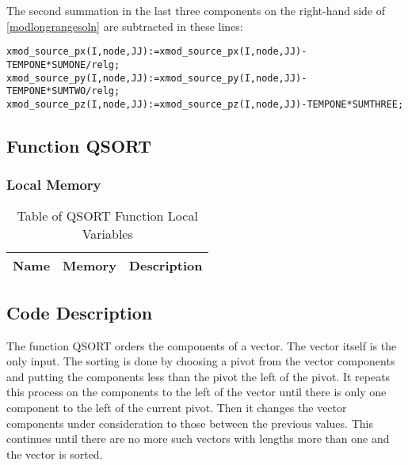 \documentclass[oneside,12pt]{book}
\begin{document}
The second summation in the last three components on the right-hand side of \eqref{modlongrangesoln} are subtracted in these lines:
\begin{small}
\begin{lstlisting}
xmod_source_px(I,node,JJ):=xmod_source_px(I,node,JJ)-TEMPONE*SUMONE/relg;
xmod_source_py(I,node,JJ):=xmod_source_py(I,node,JJ)-TEMPONE*SUMTWO/relg;
xmod_source_pz(I,node,JJ):=xmod_source_pz(I,node,JJ)-TEMPONE*SUMTHREE;
\end{lstlisting} 
\end{small}


\subsection{Function QSORT}
\subsubsection*{Local Memory}
\begin{center}
\begin{table}[ht]
\begin{tabular}{|c|c|p{5in}|}
\hline
\textbf{Name} & \textbf{Memory} & \textbf{Description}\\
\hline
\end{tabular}
\caption{Table of QSORT Function Local Variables}
\end{table}
\end{center}
\subsection{Code Description}
The function QSORT orders the components of a vector.  The vector itself is the only input.  The sorting is done by choosing a pivot from the vector components and putting the components less than the pivot the left of the pivot.  It repeats this process on the components to the left of the vector until there is only one component to the left of the current pivot.  Then it changes the vector components under consideration to those between the previous  values.  This continues until there are no more such vectors with lengths more than one and the vector is sorted.
\end{document}
